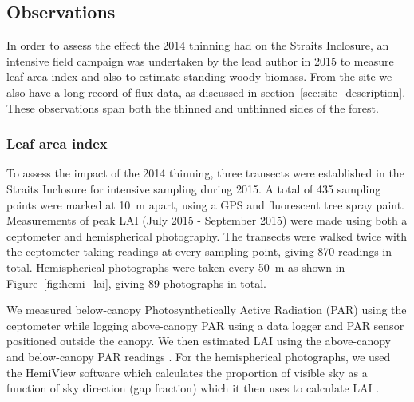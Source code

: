 \documentclass[draft,linenumbers]{agujournal}
\begin{document}
\subsection{Observations} \label{sec:obs}

In order to assess the effect the 2014 thinning had on the Straits Inclosure, an intensive field campaign was undertaken {\color{blue} by the lead author} in 2015 to measure leaf area index and also to estimate standing woody biomass. From the site we also have a long record of flux data, as discussed in section~\ref{sec:site_description}. These observations span both the thinned and unthinned sides of the forest.

\subsubsection{Leaf area index}

To assess the impact of the 2014 thinning, three transects were established in the Straits Inclosure for intensive sampling during 2015. A total of 435 sampling points were marked at 10~m apart, using a GPS and fluorescent tree spray paint. Measurements of peak LAI (July 2015 - September 2015) were made using both a ceptometer and hemispherical photography. The transects were walked twice with the ceptometer taking readings at every sampling point, giving 870 readings in total. Hemispherical photographs were taken every 50~m as shown in Figure~\ref{fig:hemi_lai}, giving 89 photographs in total. 

We measured below-canopy Photosynthetically Active Radiation (PAR) using the ceptometer while logging above-canopy PAR using a data logger and PAR sensor positioned outside the canopy. We then estimated LAI using the above-canopy and below-canopy PAR readings \citep{fassnacht1994comparison}. For the hemispherical photographs, we used the HemiView software \citep{rich1999hemiview} which calculates the proportion of visible sky as a function of sky direction (gap fraction) which it then uses to calculate LAI \citep{Jonckheere2004}.
\end{document}
